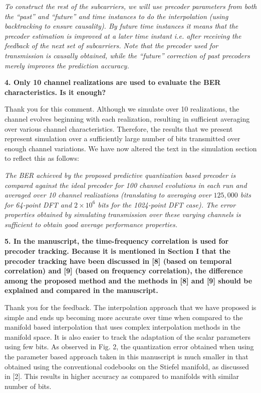 \documentclass[12pt]{letter}
\begin{document}
\emph{To construct the rest of the subcarriers, we will use
precoder parameters from both the ``past'' and ``future'' and time
instances to do the interpolation (using backtracking to ensure
causality). By future time instances it means that the precoder
estimation is improved at a later time instant i.e. after receiving
the feedback of the next set of subcarriers. Note that the precoder
used for transmission is causally obtained, while the ``future''
correction of past precoders merely improves the prediction
accuracy.}

\textbf{4. Only 10 channel realizations are used to evaluate the BER characteristics. Is it enough?}

Thank you for this comment. Although we simulate over 10 realizations,
the channel evolves beginning with each realization, resulting in
sufficient averaging over various channel characteristics. Therefore,
the results that we present represent simulation over a sufficiently
large number of bits transmitted over enough channel variations. We
have now altered the text in the simulation section to reflect this as
follows:

\emph{The BER achieved by the proposed predictive quantization based
  precoder is compared against the ideal precoder for 100 channel
  evolutions in each run and averaged over 10 channel realizations
  (translating to averaging over $125,000$ bits for 64-point DFT and
  $2\times 10^6$ bits for the 1024-point DFT case). The error
  properties obtained by simulating transmission over these varying
  channels is sufficient to obtain good average performance
  properties.}

\textbf{5. In the manuscript, the time-frequency correlation is used for precoder tracking. Because it is mentioned in Section I that the precoder tracking have been discussed in [8] (based on temporal correlation) and [9] (based on frequency correlation), the difference among the proposed method and the methods in [8] and [9] should be explained and compared in the manuscript.}

Thank you for the feedback. The interpolation approach that we have
proposed is simple and ends up becoming more accurate over time when
compared to the manifold based interpolation that uses complex
interpolation methods in the manifold space. It is also easier to
track the adaptation of the scalar parameters using few bits. As
observed in Fig. 2, the quantization error obtained when using the
parameter based approach taken in this manuscript is much smaller in
that obtained using the conventional codebooks on the Stiefel
manifold, as discussed in [2]. This results in higher accuracy as
compared to manifolds with similar number of bits.
\end{document}
